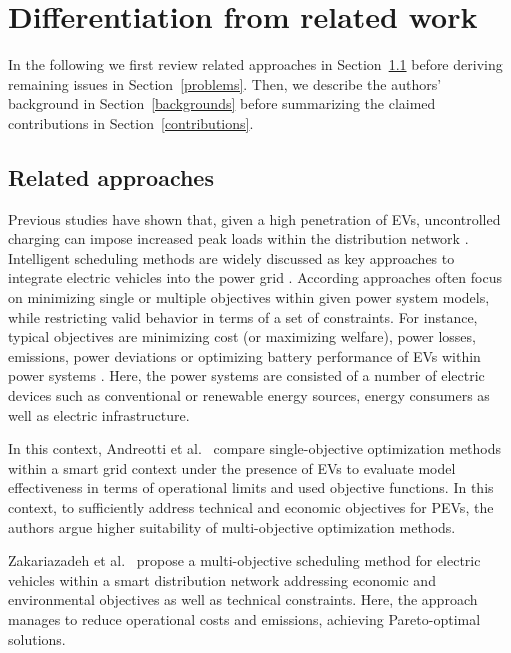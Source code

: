 \section{Differentiation from related work}
\label{related_work}

In the following we first review related approaches in Section~\ref{approaches} before deriving remaining issues in Section~\ref{problems}. Then, we describe the authors' background in Section~\ref{backgrounds} before summarizing the claimed contributions in Section~\ref{contributions}.

\subsection{Related approaches}
\label{approaches}

Previous studies have shown that, given a high penetration of EVs, uncontrolled charging can impose increased peak loads within the distribution network \cite{lopes2009identifying}. Intelligent scheduling methods are widely discussed as key approaches to integrate electric vehicles into the power grid \cite{yang2015computational}. According approaches often focus on minimizing single or multiple objectives within given power system models, while restricting valid behavior in terms of a set of constraints. For instance, typical objectives are minimizing cost (or maximizing welfare), power losses, emissions, power deviations or optimizing battery performance of EVs within power systems \cite{yang2015computational}. Here, the power systems are consisted of a number of electric devices such as conventional or renewable energy sources, energy consumers as well as electric infrastructure.

In this context, Andreotti et al.~\cite{andreotti2012review} compare single-objective optimization methods within a smart grid context under the presence of EVs to evaluate model effectiveness in terms of operational limits and used objective functions. In this context, to sufficiently address technical and economic objectives for PEVs, the authors argue higher suitability of multi-objective optimization methods. 

Zakariazadeh et al.~\cite{zakariazadeh2014multi} propose a multi-objective scheduling method for electric vehicles within a smart distribution network addressing economic and environmental objectives as well as technical constraints. Here, the approach manages to reduce operational costs and emissions, achieving Pareto-optimal solutions.

